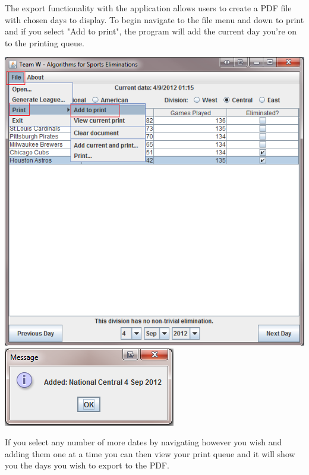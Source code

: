 The export functionality with the application allows users to create a PDF file with chosen days to display. To begin navigate to the file menu and down to print and if you select "Add to print", the program will add the current day you're on to the printing queue.

\includegraphics[width=\linewidth,keepaspectratio]{images/userManualDesk9.png}
\includegraphics[width=\linewidth,keepaspectratio]{images/userManualDesk10.png}

If you select any number of more dates by navigating however you wish and adding them one at a time you can then view your print queue and it will show you the days you wish to export to the PDF.

